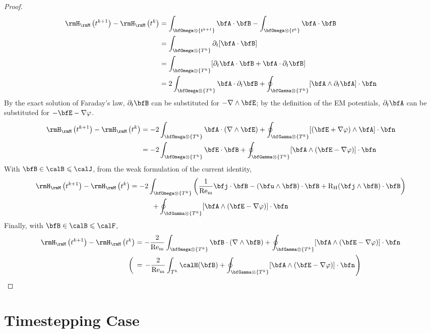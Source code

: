         \begin{proof}
            \begin{align}
                \rmH_{\rmM}\left(t^{k + 1}\right) - \rmH_{\rmM}\left(t^{k}\right)  &=  \int_{\bfOmega\otimes\left\{t^{k + 1}\right\}}\bfA\cdot\bfB - \int_{\bfOmega\otimes\left\{t^{k}\right\}}\bfA\cdot\bfB  \\
                &=  \int_{\bfOmega\otimes\left\{T^{k}\right\}}\partial_{t}[\bfA\cdot\bfB]  \\
                &=  \int_{\bfOmega\otimes\left\{T^{k}\right\}}[\partial_{t}\bfA\cdot\bfB + \bfA\cdot\partial_{t}\bfB]  \\
                &=  2\int_{\bfOmega\otimes\left\{T^{k}\right\}}\bfA\cdot\partial_{t}\bfB + \oint_{\bfGamma\otimes\left\{T^{k}\right\}}[\bfA\wedge\partial_{t}\bfA]\cdot\bfn
            \end{align}
            By the exact solution of Faraday's law, $\partial_{t}\bfB$ can be substituted for $- \nabla\wedge\bfE$; by the definition of the EM potentials, $\partial_{t}\bfA$ can be substituted for $- \bfE - \nabla\varphi$.
            \begin{align}
                \rmH_{\rmM}\left(t^{k + 1}\right) - \rmH_{\rmM}\left(t^{k}\right)  &=  - 2\int_{\bfOmega\otimes\left\{T^{k}\right\}}\bfA\cdot(\nabla\wedge\bfE) + \oint_{\bfGamma\otimes\left\{T^{k}\right\}}[(\bfE + \nabla\varphi)\wedge\bfA]\cdot\bfn  \\
                &=  - 2\int_{\bfOmega\otimes\left\{T^{k}\right\}}\bfE\cdot\bfB + \oint_{\bfGamma\otimes\left\{T^{k}\right\}}[\bfA\wedge(\bfE - \nabla\varphi)]\cdot\bfn
            \end{align}
            With $\bfB  \in  \calB  \leqslant  \calJ$, from the weak formulation of the current identity,
            \begin{multline}
                \rmH_{\rmM}\left(t^{k + 1}\right) - \rmH_{\rmM}\left(t^{k}\right)  =  - 2\int_{\bfOmega\otimes\left\{T^{k}\right\}}\left(\frac{1}{\rmRem}\bfj\cdot\bfB - (\bfu\wedge\bfB)\cdot\bfB + \rmRH(\bfj\wedge\bfB)\cdot\bfB\right)  \\
                + \oint_{\bfGamma\otimes\left\{T^{k}\right\}}[\bfA\wedge(\bfE - \nabla\varphi)]\cdot\bfn
            \end{multline}
            Finally, with $\bfB  \in  \calB  \leqslant  \calF$,
            \begin{align}
                \rmH_{\rmM}\left(t^{k + 1}\right) - \rmH_{\rmM}\left(t^{k}\right)  &=  - \frac{2}{\rmRem}\int_{\bfOmega\otimes\left\{T^{k}\right\}}\bfB\cdot(\nabla\wedge\bfB) + \oint_{\bfGamma\otimes\left\{T^{k}\right\}}[\bfA\wedge(\bfE - \nabla\varphi)]\cdot\bfn  \\
                \left(\tall\right.&=  \left.- \frac{2}{\rmRem}\int_{T^{k}}\calH(\bfB) + \oint_{\bfGamma\otimes\left\{T^{k}\right\}}[\bfA\wedge(\bfE - \nabla\varphi)]\cdot\bfn\tall\right)
            \end{align}
        \end{proof}

        
    \section*{Timestepping Case}
